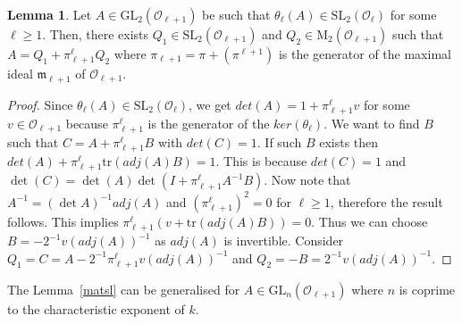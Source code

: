 \documentclass[10pt,twoside]{amsart}
\newcommand{\GL}{\mathrm{GL}}
\newcommand{\SL}{\mathrm{SL}}
\newcommand{\tr}{\mathrm{tr}}
\newcommand{\M}{\mathrm{M}}
\theoremstyle{definition}
\theoremstyle{definition}
\newtheorem{lemma}[theorem]{Lemma}
\begin{document}
\begin{lemma}{\label{matsl}}
Let $A\in \GL_2(\mathcal{O}_{\ell + 1})$ be such that $\theta_{\ell}(A) \in \SL_2(\mathcal{O}_{\ell})$ for some $\ell\geq 1$. Then, there exists $Q_1 \in \SL_2( \mathcal{O}_{ \ell + 1})$ and $Q_2 \in \M_2(\mathcal{O}_{\ell +1})$ such that $A = Q_1 + \pi_{\ell+1}^{\ell} Q_2$ where $\pi_{\ell + 1} = \pi +(\pi^{\ell+1})$ is the generator of the maximal ideal $\mathfrak{m}_{\ell+1}$ of $\mathcal{O}_{\ell+1}$. 
\end{lemma}
\begin{proof}
Since $\theta_{\ell}(A) \in \SL_2(\mathcal{O}_{\ell})$, we get $det(A) = 1 + \pi_{\ell+1}^{\ell} v$ for some $v \in \mathcal{O}_{\ell + 1}$ because $\pi_{\ell+1}^{\ell}$ is the generator of the $ker(\theta_{\ell})$. We want to find $B$ such that $C = A + \pi_{\ell+1}^{\ell} B$ with $det(C) = 1$. If such $B$ exists then $det(A) + \pi_{\ell+1}^{\ell} \tr(adj(A)B)=1$. This is because $det(C)=1$ and $\det(C) =\det(A) \det(I + \pi_{\ell+1}^{\ell}A^{-1}B)$. Now note that $A^{-1} =(\det A)^{-1} adj(A)$ and $(\pi_{\ell+1}^{\ell})^2=0$ for $\ell\geq 1$, therefore the result follows. This implies $\pi_{\ell+1}^{\ell}(v + \tr(adj(A)B))=0$. Thus we can choose $B = -2^{-1}v (adj(A))^{-1}$ as $adj(A)$ is invertible. Consider $Q_1 = C = A-2^{-1}\pi_{\ell + 1}^{\ell} v(adj(A))^{-1}$ and $Q_2 = -B = 2^{-1}v(adj(A))^{-1}$.
\end{proof}
\noindent The Lemma~\ref{matsl} can be generalised for $A\in \GL_n(\mathcal{O}_{\ell+1})$ where $n$ is coprime to the characteristic exponent of $k$.
\end{document}
